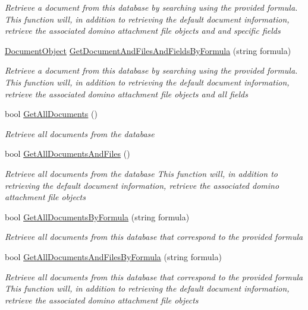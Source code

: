\begin{DoxyCompactItemize}
\begin{DoxyCompactList}\small\item\em Retrieve a document from this database by searching using the provided formula. This function will, in addition to retrieving the default document information, retrieve the associated domino attachment file objects and and specific fields \end{DoxyCompactList}\item 
\mbox{\hyperlink{class_document_object}{Document\+Object}} \mbox{\hyperlink{class_database_object_a8df18648821ead79c6709a73fd54afeb}{Get\+Document\+And\+Files\+And\+Fields\+By\+Formula}} (string formula)
\begin{DoxyCompactList}\small\item\em Retrieve a document from this database by searching using the provided formula. This function will, in addition to retrieving the default document information, retrieve the associated domino attachment file objects and all fields \end{DoxyCompactList}\item 
bool \mbox{\hyperlink{class_database_object_ad3010e55b2e75d0863e168fed1e279c5}{Get\+All\+Documents}} ()
\begin{DoxyCompactList}\small\item\em Retrieve all documents from the database \end{DoxyCompactList}\item 
bool \mbox{\hyperlink{class_database_object_a72239fa2b2a549665e45cdd340cd70a0}{Get\+All\+Documents\+And\+Files}} ()
\begin{DoxyCompactList}\small\item\em Retrieve all documents from the database This function will, in addition to retrieving the default document information, retrieve the associated domino attachment file objects \end{DoxyCompactList}\item 
bool \mbox{\hyperlink{class_database_object_a6bfb480373a7e2bdbeaa67e4e3303a3a}{Get\+All\+Documents\+By\+Formula}} (string formula)
\begin{DoxyCompactList}\small\item\em Retrieve all documents from this database that correspond to the provided formula \end{DoxyCompactList}\item 
bool \mbox{\hyperlink{class_database_object_ac478ff9264805edc8569d510916c4c00}{Get\+All\+Documents\+And\+Files\+By\+Formula}} (string formula)
\begin{DoxyCompactList}\small\item\em Retrieve all documents from this database that correspond to the provided formula This function will, in addition to retrieving the default document information, retrieve the associated domino attachment file objects \end{DoxyCompactList}\item 

\end{DoxyCompactItemize}
